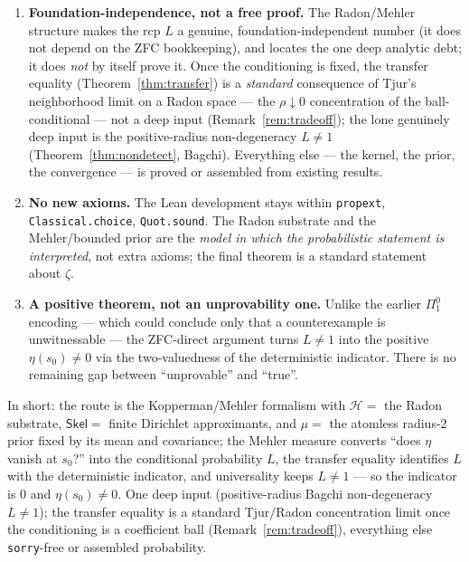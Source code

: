 \documentclass[11pt,a4paper]{article}
\theoremstyle{definition}
\begin{document}
\begin{enumerate}
  \item \textbf{Foundation-independence, not a free proof.} The Radon/Mehler structure makes
        the rcp \(L\) a genuine, foundation-independent number (it does not depend on the
        ZFC bookkeeping), and locates the one deep analytic debt; it does \emph{not} by
        itself prove it. Once the conditioning is fixed, the transfer equality
        (Theorem~\ref{thm:transfer}) is a \emph{standard} consequence of Tjur's neighborhood
        limit on a Radon space --- the \(\rho\downarrow0\) concentration of the ball-conditional ---
        not a deep input (Remark~\ref{rem:tradeoff}); the lone genuinely deep input is the
        positive-radius non-degeneracy \(L\neq1\) (Theorem~\ref{thm:nondetect}, Bagchi). Everything else --- the kernel, the
        prior, the convergence --- is proved or assembled from existing results.
  \item \textbf{No new axioms.} The Lean development stays within \texttt{propext},
        \texttt{Classical.choice}, \texttt{Quot.sound}. The Radon substrate and the
        Mehler/bounded prior are the \emph{model in which the probabilistic statement is
        interpreted}, not extra axioms; the final theorem is a standard statement about
        \(\zeta\).
  \item \textbf{A positive theorem, not an unprovability one.} Unlike the earlier
        \(\Pi^0_1\) encoding --- which could conclude only that a counterexample is
        unwitnessable --- the ZFC-direct argument turns \(L\neq1\) into the positive
        \(\eta(s_0)\neq0\) via the two-valuedness of the deterministic indicator. There is
        no remaining gap between ``unprovable'' and ``true''.
\end{enumerate}

\noindent In short: the route is the Kopperman/Mehler formalism with \(\mathcal{H}=\) the
Radon substrate, \(\mathsf{Skel}=\) finite Dirichlet approximants, and \(\mu=\) the atomless
radius-\(2\) prior fixed by its mean and covariance; the Mehler measure converts ``does
\(\eta\) vanish at \(s_0\)?'' into the conditional probability \(L\), the transfer equality
identifies \(L\) with the deterministic indicator, and universality keeps \(L\neq1\) --- so
the indicator is \(0\) and \(\eta(s_0)\neq0\). One deep input (positive-radius Bagchi
non-degeneracy \(L\neq1\)); the transfer equality is a standard Tjur/Radon concentration
limit once the conditioning is a coefficient ball (Remark~\ref{rem:tradeoff}), everything
else \texttt{sorry}-free or assembled probability.
\end{document}
